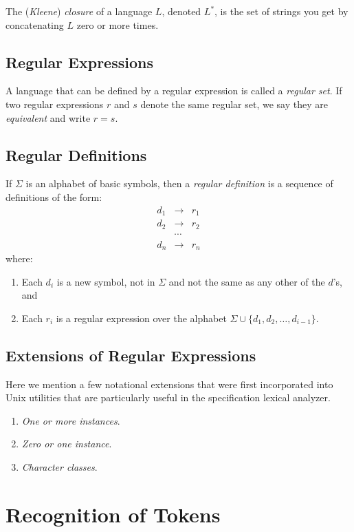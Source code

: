 \documentclass[12pt,a4paper,twoside,openany]{book}
\begin{document}
The (\textit{Kleene}) \textit{closure} of a language $L$, denoted $L^*$, is the set of strings you get by concatenating $L$ zero or more times.

\subsection{Regular Expressions}

A language that can be defined by a regular expression is called a \textit{regular set}. If two regular expressions $r$ and $s$ denote the same regular set, we say they are \textit{equivalent} and write $r=s$.

\subsection{Regular Definitions}

If $\Sigma$ is an alphabet of basic symbols, then a \textit{regular definition} is a sequence of definitions of the form: $$\begin{array}{ccc}d_1&\to&r_1\\d_2&\to&r_2\\&\cdots\\d_n&\to&r_n\end{array}$$ where:
\begin{enumerate}
    \item Each $d_i$ is a new symbol, not in $\Sigma$ and not the same as any other of the $d$'s, and
    \item Each $r_i$ is a regular expression over the alphabet $\Sigma\cup\{d_1,d_2,\ldots,d_{i-1}\}$.
\end{enumerate}

\subsection{Extensions of Regular Expressions}

Here we mention a few notational extensions that were first incorporated into Unix utilities that are particularly useful in the specification lexical analyzer.
\begin{enumerate}
    \item\textit{One or more instances}.
    \item\textit{Zero or one instance}.
    \item\textit{Character classes}.
\end{enumerate}

\section{Recognition of Tokens}
\end{document}
